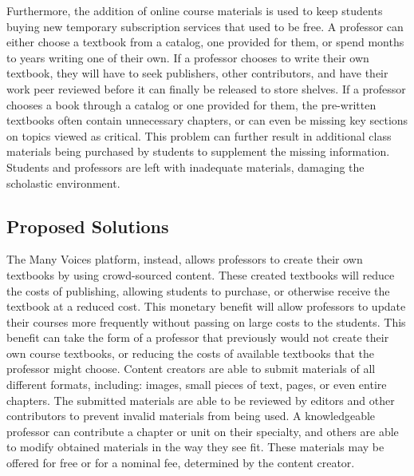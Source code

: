 \documentclass[letterpaper, 10pt, draftclsnofoot, onecolumn, compsoc]{IEEEtran}
\begin{document}
\medskip

{\noindent Furthermore, the addition of online course materials is used 
to keep students buying new temporary subscription services that used to 
be free. 
A professor can either choose a textbook from a catalog, one provided 
for them, or spend months to years writing one of their own. 
If a professor chooses to write their own textbook, 
they will have to seek publishers, other contributors, and have 
their work peer reviewed before it can finally be released to store 
shelves. 
If a professor chooses a book through a catalog or one provided for 
them, the pre-written textbooks often contain unnecessary chapters, 
or can even be missing key sections on topics viewed as critical. 
This problem can further result in additional class materials being 
purchased by students to supplement the missing information. 
Students and professors are left with inadequate materials, damaging 
the scholastic environment. \par}

\subsection{Proposed Solutions}
\vspace{1pc}

{\noindent The Many Voices platform, instead, allows professors to create 
their own textbooks by using crowd-sourced content. These created textbooks
will reduce the costs of publishing, allowing students to purchase, or 
otherwise receive the textbook at a reduced cost. This monetary benefit
will allow professors to update their courses more frequently without 
passing on large costs to the students. This benefit can take the form of 
a professor that previously would not create their own course textbooks, or 
reducing the costs of available textbooks that the professor might choose.
Content creators are able to submit materials of all different formats, 
including: images, small pieces of text, pages, or even entire chapters. 
The submitted materials are able to be reviewed by editors and 
other contributors to prevent invalid materials from being used.
A knowledgeable professor can contribute a chapter or unit on 
their specialty, and others are able to modify obtained materials 
in the way they see fit. These materials may be offered for free 
or for a nominal fee, determined by the content creator. \par}
\end{document}
